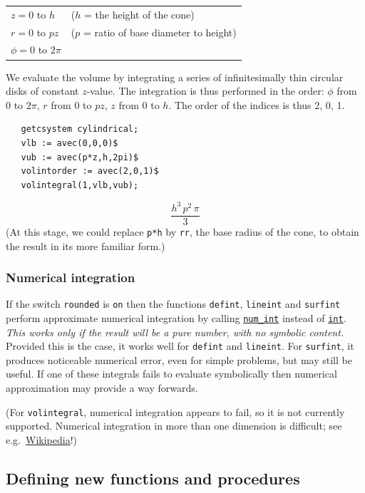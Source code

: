 \begin{tabular}{l l}
$z = 0$ to $h$  & ($h$ = the height of the cone) \\
$r = 0$ to $p z$ & ($p$ = ratio of base diameter to height) \\
$\phi = 0$ to $2\pi$
\end{tabular}

We evaluate the volume by integrating a series of infinitesimally thin
circular disks of constant $z$-value. The integration is thus
performed in the order: $\phi$ from 0 to $2\pi$, $r$ from 0 to $pz$,
$z$ from 0 to $h$.  The order of the indices is thus 2, 0, 1.
\begin{verbatim}
   getcsystem cylindrical;
   vlb := avec(0,0,0)$
   vub := avec(p*z,h,2pi)$
   volintorder := avec(2,0,1)$
   volintegral(1,vlb,vub);
\end{verbatim}
\[ \frac{h^3\,p^2\,\pi}{3} \]
(At this stage, we could replace \texttt{p*h} by \texttt{rr}, the base
radius of the cone, to obtain the result in its more familiar form.)

\subsubsection{Numerical integration}

If the switch \texttt{rounded} is \texttt{on} then the
functions \texttt{defint}, \texttt{lineint} and \texttt{surfint}
perform approximate numerical integration by
calling \hyperlink{operator:NUM_INT}{\texttt{num\_int}} instead
of \hyperlink{operator:INT}{\texttt{int}}.  \emph{This works only if
the result will be a pure number, with no symbolic content.}  Provided
this is the case, it works well for \texttt{defint} and
\texttt{lineint}.  For \texttt{surfint}, it produces noticeable
numerical error, even for simple problems, but may still be useful.
If one of these integrals fails to evaluate symbolically then
numerical approximation may provide a way forwards.

(For \texttt{volintegral}, numerical integration appears to fail, so
it is not currently supported.  Numerical integration in more than one
dimension is difficult; see e.g.\
\href{https://en.wikipedia.org/wiki/Numerical_integration#Multidimensional_integrals}{Wikipedia}!)


\subsection{Defining new functions and procedures}


